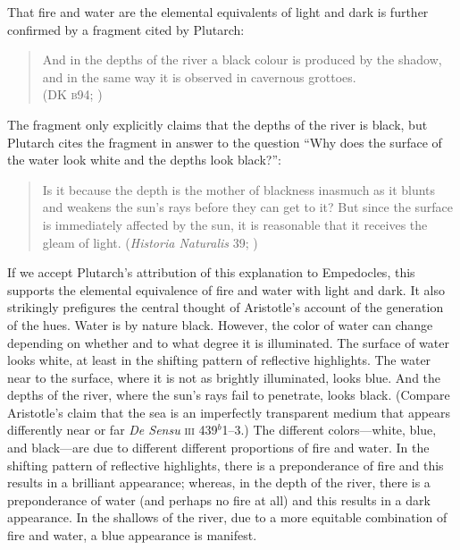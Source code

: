 That fire and water are the elemental equivalents of light and dark is further confirmed by a fragment cited by Plutarch:
\begin{verse}
    And in the depths of the river a black colour is produced by the shadow,\\
    and in the same way it is observed in cavernous grottoes.\\
    (DK \textsc{b}94; \citealt[105 261]{Inwood:2001ve})
\end{verse}
The fragment only explicitly claims that the depths of the river is black, but Plutarch cites the fragment in answer to the question ``Why does the surface of the water look white and the depths look black?'':
\begin{quote}
    Is it because the depth is the mother of blackness inasmuch as it blunts and weakens the sun's rays before they can get to it? But since the surface is immediately affected by the sun, it is reasonable that it receives the gleam of light.  (\emph{Historia Naturalis} 39; \citealt[\textsc{CTXT}-87 137--138]{Inwood:2001ve})
\end{quote}
If we accept Plutarch's attribution of this explanation to Empedocles, this supports the elemental equivalence of fire and water with light and dark. It also strikingly prefigures the central thought of Aristotle's account of the generation of the hues. Water is by nature black. However, the color of water can change depending on whether and to what degree it is illuminated. The surface of water looks white, at least in the shifting pattern of reflective highlights. The water near to the surface, where it is not as brightly illuminated, looks blue. And the depths of the river, where the sun's rays fail to penetrate, looks black. (Compare Aristotle's claim that the sea is an imperfectly transparent medium that appears differently near or far \emph{De Sensu} \textsc{iii} 439\( ^{b} \)1--3.) The different colors---white, blue, and black---are due to different different proportions of fire and water. In the shifting pattern of reflective highlights, there is a preponderance of fire and this results in a brilliant appearance; whereas, in the depth of the river, there is a preponderance of water (and perhaps no fire at all) and this results in a dark appearance. In the shallows of the river, due to a more equitable combination of fire and water, a blue appearance is manifest.

